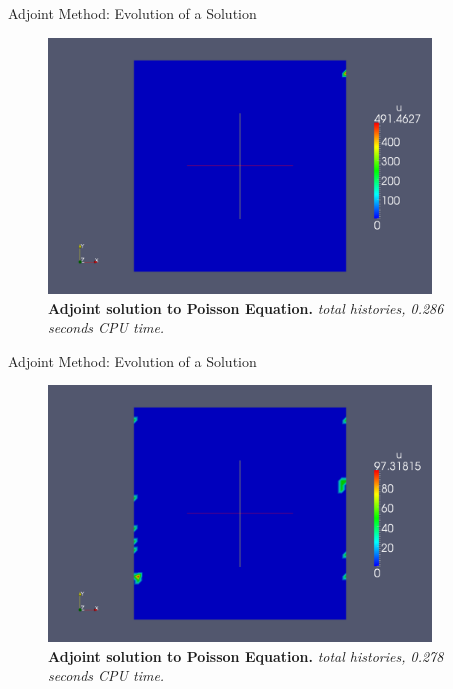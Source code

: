 \documentclass{beamer}
\begin{document}
\begin{frame}{Adjoint Method: Evolution of a Solution}

  \begin{figure}[h!]
    \begin{center}
      \includegraphics[width=4in]{../../prelim/presentation/adjoint_1.png}
    \end{center}
    \caption{\textbf{Adjoint solution to Poisson Equation.}
      \textit{ total histories, 0.286 seconds CPU time.} }
  \end{figure}

\end{frame}

\begin{frame}{Adjoint Method: Evolution of a Solution}

  \begin{figure}[h!]
    \begin{center}
      \includegraphics[width=4in]{../../prelim/presentation/adjoint_10.png}
    \end{center}
    \caption{\textbf{Adjoint solution to Poisson Equation.}
      \textit{ total histories, 0.278 seconds CPU time.} }
  \end{figure}

\end{frame}
\end{document}
